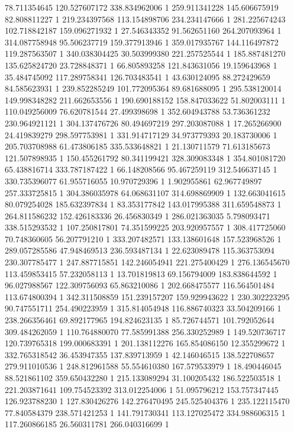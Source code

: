 78.711354645	120.527607172	338.834962006	1
259.911341228	145.606675919	82.808811227	1
219.234397568	113.154898706	234.234147666	1
281.225674243	102.718842187	159.096271932	1
27.546343352	91.562651160	264.207093964	1
314.087758948	95.506237719	159.377913946	1
359.017935767	144.116497872	119.287563507	1
340.038304425	30.503999380	221.257525544	1
185.887481270	135.625824720	23.728848371	1
66.805893258	121.843631056	19.159643968	1
35.484745092	117.289758341	126.703483541	1
43.630124095	88.272429659	84.585623931	1
239.852285249	101.772095364	89.681688095	1
295.538120014	149.998348282	211.662653556	1
190.690188152	158.847033622	51.802003111	1
110.049256009	76.620781544	27.499398698	1
352.604943788	53.736361232	230.964921121	1
304.137476726	80.494697219	297.203087088	1
17.265266900	24.419839279	298.597753981	1
331.914717129	34.973779393	20.183730006	1
205.703708988	61.473806185	335.533648821	1
21.130711579	71.613185673	121.507898935	1
150.455261792	80.341199421	328.309083348	1
354.801081720	65.438816714	333.787187422	1
66.148208566	95.467259119	312.546637145	1
330.735396077	61.955716055	10.970729396	1
1.902955861	62.967749897	257.333725815	1
304.386035978	64.068631107	314.698869909	1
132.663041615	80.079254028	185.632397834	1
83.353177842	143.017995388	311.659548873	1
264.811586232	152.426183336	26.456830349	1
286.021363035	5.798093471	338.515293532	1
107.250817801	74.351599225	203.920957557	1
308.417725060	70.748360605	56.207791210	1
333.207482571	133.138601648	157.523968526	1
289.057285586	47.948469513	236.593487134	1
22.623089478	115.363753094	230.307785477	1
247.887715851	142.246054941	221.275400429	1
276.136545670	113.459853415	57.232058113	1
13.701819813	69.156794009	183.838644592	1
96.027988567	122.309756093	65.863210086	1
202.668475577	116.564501484	113.674800394	1
342.311508859	151.239157207	159.929943622	1
230.302223295	90.747551711	254.490223959	1
315.814054948	116.886740323	33.504209166	1
238.266356461	69.892177965	194.824623135	1
85.726744571	101.792052644	309.484262059	1
110.764880070	77.585991388	256.330252989	1
149.520736717	120.739765318	199.000683391	1
201.138112276	165.854086150	12.355299672	1
332.765318542	36.453947355	137.839713959	1
42.146046515	138.522708657	279.911010536	1
248.812961588	55.554610380	167.579533979	1
18.490446045	88.521861102	359.650432280	1
215.133089294	31.100205432	186.522503518	1
221.203871641	109.754523392	313.012254006	1
51.095796212	153.757347445	126.923788230	1
127.830426276	142.276470495	245.525404376	1
235.122115470	77.840584379	238.571421253	1
141.791730341	113.127025472	334.988606315	1
117.260866185	26.560311781	266.040316699	1
